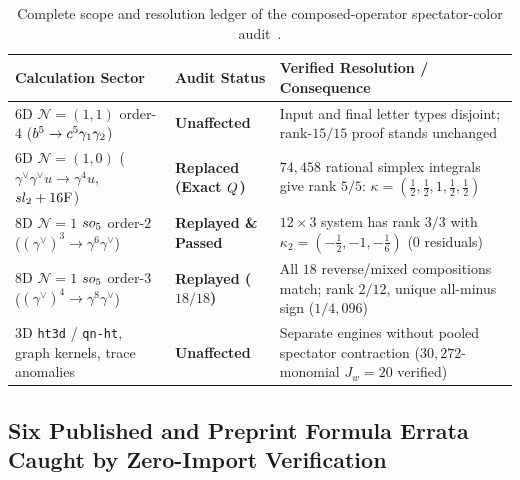 \begin{table}[H]
\centering
\scriptsize
\setlength{\tabcolsep}{3.8pt}
\renewcommand{\arraystretch}{1.16}
\begin{tabularx}{\textwidth}{@{}ll>{\raggedright\arraybackslash}X@{}}
\toprule
\textbf{Calculation Sector} & \textbf{Audit Status} & \textbf{Verified Resolution / Consequence} \\
\midrule
$6\mathrm{D}$ $\mathcal{N}=(1,1)$ order-$4$ ($b^5 \to c^5\gamma_1\gamma_2$) & \textbf{Unaffected} & Input and final letter types disjoint; rank-$15/15$ proof stands unchanged \\
$6\mathrm{D}$ $\mathcal{N}=(1,0)$ ($\gamma^\vee\gamma^\vee u \to \gamma^4 u$, $sl_2+16\mathrm{F}$) & \textbf{Replaced (Exact $Q$)} & $74{,}458$ rational simplex integrals give rank $5/5$: $\kappa = (\frac{1}{2},\frac{1}{2},1,\frac{1}{2},\frac{1}{2})$ \\
$8\mathrm{D}$ $\mathcal{N}=1$ $so_5$ order-$2$ ($(\gamma^\vee)^3 \to \gamma^6\gamma^\vee$) & \textbf{Replayed \& Passed} & $12\times 3$ system has rank $3/3$ with $\kappa_2 = (-\frac{1}{2},-1,-\frac{1}{6})$ ($0$ residuals) \\
$8\mathrm{D}$ $\mathcal{N}=1$ $so_5$ order-$3$ ($(\gamma^\vee)^4 \to \gamma^8\gamma^\vee$) & \textbf{Replayed ($18/18$)} & All $18$ reverse/mixed compositions match; rank $2/12$, unique all-minus sign ($1/4{,}096$) \\
$3\mathrm{D}$ \texttt{ht3d} / \texttt{qn-ht}, graph kernels, trace anomalies & \textbf{Unaffected} & Separate engines without pooled spectator contraction ($30{,}272$-monomial $J_w=20$ verified) \\
\bottomrule
\end{tabularx}
\caption{Complete scope and resolution ledger of the composed-operator spectator-color audit~\cite{Repo9e833c8}.}
\label{tab:spectator-audit}
\end{table}

\subsection{Six Published and Preprint Formula Errata Caught by Zero-Import Verification}
\label{subsec:app-errata}

